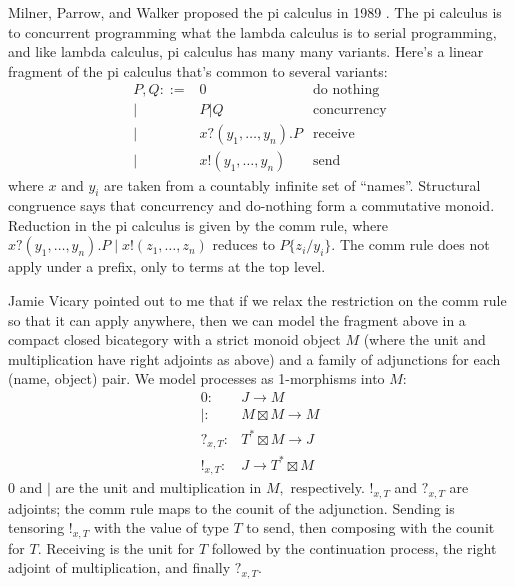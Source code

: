 \documentclass[12pt,twoside,openright]{report}
\newcommand{\maps}{\colon}
\begin{document}
Milner, Parrow, and Walker proposed the pi calculus in 1989 \cite{MPW89}.  The pi calculus is to concurrent programming what the lambda calculus is to serial programming, and like lambda calculus, pi calculus has many many variants.  Here's a linear fragment of the pi calculus that's common to several variants:
\[\begin{array}{rll}
  P,Q ::= & 0 & \mbox{do nothing} \\
  |& P | Q & \mbox{concurrency}\\
  |& x?(y_1, \ldots, y_n).P & \mbox{receive}\\
  |& x!(y_1, \ldots, y_n) & \mbox{send}
\end{array}\]
where $x$ and $y_i$ are taken from a countably infinite set of ``names''.  Structural congruence says that concurrency and do-nothing form a commutative monoid.  Reduction in the pi calculus is given by the comm rule, where $x?(y_1, \ldots, y_n).P \;|\; x!(z_1, \ldots, z_n)$ reduces to $P\{z_i / y_i\}$.  The comm rule does not apply under a prefix, only to terms at the top level.

Jamie Vicary pointed out to me that if we relax the restriction on the comm rule so that it can apply anywhere, then we can model the fragment above in a compact closed bicategory with a strict monoid object $M$ (where the unit and multiplication have right adjoints as above) and a family of adjunctions for each (name, object) pair.  We model processes as 1-morphisms into $M$:
\[\begin{array}{rl}
0\maps & J \to M\\
|\maps & M \boxtimes M \to M\\
?_{x, T}\maps & T^* \boxtimes M \to J\\
!_{x, T}\maps & J \to T^* \boxtimes M
\end{array}\]
$0$ and $|$ are the unit and multiplication in $M,$ respectively.  $!_{x, T}$ and $?_{x, T}$ are adjoints; the comm rule maps to the counit of the adjunction.  Sending is tensoring $!_{x,T}$ with the value of type $T$ to send, then composing with the counit for $T.$  Receiving is the unit for $T$ followed by the continuation process, the right adjoint of multiplication, and finally $?_{x, T}.$
\end{document}
